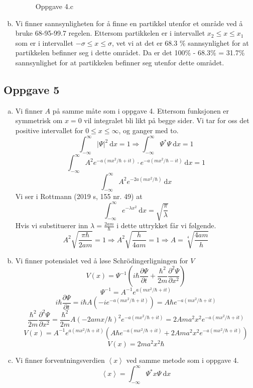 \documentclass{article}
\begin{document}
\begin{enumerate}[a)]
\begin{figure}[h!]
      \caption{Oppgave 4.c}
      \label{fig: 4.c}
    \end{figure}
    \item Vi finner sannsynligheten for å finne en partikkel utenfor et område ved å bruke 68-95-99.7 regelen. Ettersom partikkelen er i intervallet $x_2\le x\le x_1$ som er i intervallet $-σ\le x \le σ$, vet vi at det er 68.3 \% sannsynlighet for at partikkelen befinner seg i dette området. Da er det 100\% - 68.3\% = 31.7\% sannsynlighet for at partikkelen befinner seg utenfor dette området. 
\end{enumerate}

\subsection*{Oppgave 5}
\begin{enumerate}[a)]
    \item Vi finner $A$ på samme måte som i oppgave 4. Ettersom funksjonen er symmetrisk om $x=0$ vil integralet bli likt på begge sider. Vi tar for oss det positive intervallet for $0\le x\le ∞$, og ganger med to.
    \[
    ∫_{-∞}^{∞} \left|Ψ\right|^2 \ \mathrm{d}x = 1 ⇒ ∫_{-∞}^{∞} Ψ^{*}Ψ \ \mathrm{d}x = 1
    \]
    \[
    ∫_{-∞}^{∞} A^2 e^{-a(mx^2 / ℏ+it)} ⋅ e^{-a(mx^2 / ℏ - it)} \ \mathrm{d}x = 1
    \]
    \[
    ∫_{-∞}^{∞} A^2e^{-2a(mx^{2} / ℏ)} \ \mathrm{d}x
    \]
    Vi ser i Rottmann (2019 s, 155 nr. 49) at 
    \[
    ∫_{-∞}^{∞} e^{-λx^2} \ \mathrm{d}x = \sqrt{\frac{π}{λ}}
    \]
    Hvis vi substituerer inn $\displaystyle λ = \frac{2am}{ℏ}$ i dette uttrykket får vi følgende. 
    \[
    A^2 \sqrt{\frac{πℏ}{2am}} = 1 ⇒ A^2 \sqrt{\frac{h}{4am}} = 1 ⇒ A = \sqrt[4]{\frac{4am}{h}}
    \]
    \item 
    Vi finner potensialet ved å løse Schrödingerligningen for $V$
    \[
    V(x) = Ψ^{-1} \left(iℏ\frac{∂ Ψ}{∂ t} + \frac{ℏ^2}{2m}\frac{∂^2 Ψ}{∂ x^2}\right)    
    \]
    \[
    Ψ^{-1} = A^{-1}e^{a(mx^2 / ℏ + it)}
    \]
    \[
    iℏ\frac{∂ Ψ}{∂ t} = iℏA\left(-ie^{-a(mx^2 /ℏ + it)}\right) = A ℏe^{-a(mx^2 / ℏ + it)}
    \]
    \[
    \frac{ℏ^2}{2m} \frac{∂^2 Ψ}{∂ x^2} = \frac{ℏ^2}{2m}A \left(-2amx / ℏ\right)^2e^{-a(mx^2 /ℏ + it)} = 2Ama^2x^2e^{-a(mx^2 /ℏ + it)} 
    \]
    \[
    V(x) = A^{-1}e^{a(mx^{2} / ℏ + it)} \left(Aℏe^{-a(mx^2 /ℏ + it)}+ 2Ama^2x^2e^{-a(mx^2 / ℏ + it)}\right)
    \]
    \[
    V(x) = 2ma^2x^2 ℏ
    \]
    \item 
    Vi finner forventningsverdien $\left<x\right>$ ved samme metode som i oppgave 4.
    \[
    \left<x\right> = ∫_{-∞}^{∞} Ψ^{*}xΨ \ \mathrm{d}x
\]
\end{enumerate}
\end{document}
